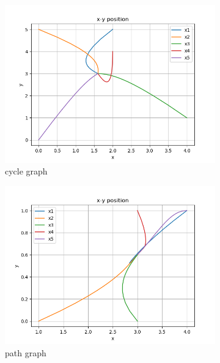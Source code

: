 \documentclass{article}
\begin{document}
\begin{problem}
\begin{figure}
\begin{subfigure}{0.4\textwidth}
            \includegraphics[width=\textwidth]{./img/p1xyposition_cycle_graph_5.png}
            \caption{cycle graph}
        \end{subfigure}
        \begin{subfigure}{0.4\textwidth}
            \includegraphics[width=\textwidth]{./img/p1xyposition_path_graph_5.png}
            \caption{path graph}
        \end{subfigure}
        \begin{subfigure}{0.4\textwidth}

\end{subfigure}
\end{figure}
\end{problem}
\end{document}
